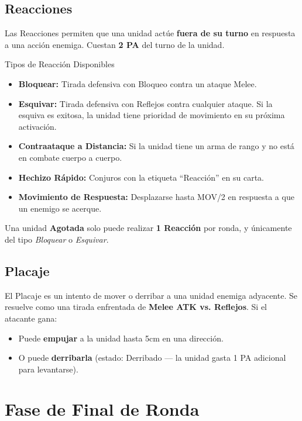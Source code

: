 \subsection*{Reacciones}

Las Reacciones permiten que una unidad actúe \textbf{fuera de su turno} en respuesta a una acción enemiga. Cuestan \textbf{2 PA} del turno de la unidad.

\begin{reglaespecial}{Tipos de Reacción Disponibles}
\begin{itemize}
    \item \textbf{Bloquear:} Tirada defensiva con Bloqueo contra un ataque Melee.
    \item \textbf{Esquivar:} Tirada defensiva con Reflejos contra cualquier ataque. Si la esquiva es exitosa, la unidad tiene prioridad de movimiento en su próxima activación.
    \item \textbf{Contraataque a Distancia:} Si la unidad tiene un arma de rango y no está en combate cuerpo a cuerpo.
    \item \textbf{Hechizo Rápido:} Conjuros con la etiqueta ``Reacción'' en su carta.
    \item \textbf{Movimiento de Respuesta:} Desplazarse hasta MOV/2 en respuesta a que un enemigo se acerque.
\end{itemize}
\end{reglaespecial}

Una unidad \textbf{Agotada} solo puede realizar \textbf{1 Reacción} por ronda, y únicamente del tipo \textit{Bloquear} o \textit{Esquivar}.

\subsection*{Placaje}

El Placaje es un intento de mover o derribar a una unidad enemiga adyacente. Se resuelve como una tirada enfrentada de \textbf{Melee ATK vs. Reflejos}. Si el atacante gana:

\begin{itemize}
    \item Puede \textbf{empujar} a la unidad hasta 5cm en una dirección.
    \item O puede \textbf{derribarla} (estado: Derribado — la unidad gasta 1 PA adicional para levantarse).
\end{itemize}

\section{Fase de Final de Ronda}

